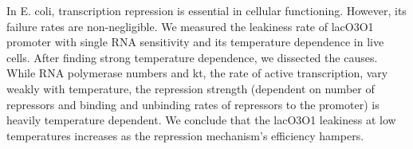 In E. coli, transcription repression is essential in cellular functioning. However, its failure rates are non-negligible. We measured the leakiness rate of lacO3O1 promoter with single RNA sensitivity and its temperature dependence in live cells. After finding strong temperature dependence, we dissected the causes. While RNA polymerase numbers and kt, the rate of active transcription, vary weakly with temperature, the repression strength (dependent on number of repressors and binding and unbinding rates of repressors to the promoter) is heavily temperature dependent. We conclude that the lacO3O1 leakiness at low temperatures increases as the repression mechanism’s efficiency hampers.
